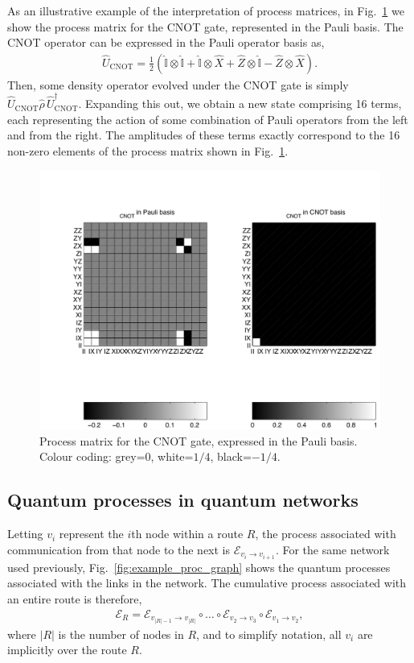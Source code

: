 \documentclass[aps, rmp, twocolumn, amsmath, amssymb, nofootinbib, superscriptaddress, longbibliography, floatfix, table-of-contents, eqsecnum]{revtex4-1}
\begin{document}
As an illustrative example of the interpretation of process matrices, in Fig.~\ref{fig:CNOT_proc_matrix} we show the process matrix for the CNOT gate, represented in the Pauli basis. The CNOT operator can be expressed in the Pauli operator basis as,
\begin{align}
\hat{U}_\text{CNOT} = \frac{1}{2}(\hat{\mathbb{I}}\otimes \hat{\mathbb{I}} + \hat{\mathbb{I}} \otimes \hat{X} + \hat{Z}\otimes \hat{\mathbb{I}} - \hat{Z}\otimes \hat{X}).
\end{align}
Then, some density operator evolved under the CNOT gate is simply \mbox{$\hat{U}_\text{CNOT}\hat\rho \,\hat{U}_\text{CNOT}^\dag$}. Expanding this out, we obtain a new state comprising 16 terms, each representing the action of some combination of Pauli operators from the left and from the right. The amplitudes of these terms exactly correspond to the 16 non-zero elements of the process matrix shown in Fig.~\ref{fig:CNOT_proc_matrix}.

\begin{figure}[!htb]
\includegraphics[width=0.7\columnwidth]{CNOT_process}
\caption{Process matrix for the CNOT gate, expressed in the Pauli basis. Colour coding: grey=0, white=$1/4$, black=$-1/4$.} \label{fig:CNOT_proc_matrix}
\end{figure}

%
%

\subsection{Quantum processes in quantum networks} \label{sec:quant_proc_in} 

Letting $v_i$ represent the $i$th node within a route $R$, the process associated with communication from that node to the next is $\mathcal{E}_{v_i\to v_{i+1}}$. For the same network used previously, Fig.~\ref{fig:example_proc_graph} shows the quantum processes associated with the links in the network. The cumulative process associated with an entire route is therefore,
\begin{align}
\mathcal{E}_R = \mathcal{E}_{{v_{|R|-1}}\to v_{|R|}} \circ \dots \circ \mathcal{E}_{v_2\to v_3} \circ \mathcal{E}_{v_1\to v_2},
\end{align}
where $|R|$ is the number of nodes in $R$, and to simplify notation, all $v_i$ are implicitly over the route $R$.
\end{document}
